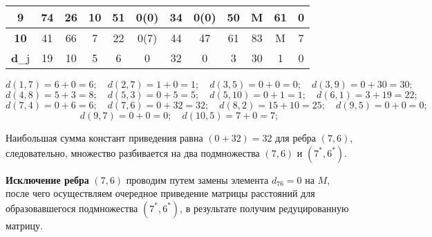 \documentclass[17pt]{extarticle}
\begin{document}
\begin{table}[H]
\begin{tabular}{|c|c|c|c|c|c|c|c|c|c|c|c|}
        \textbf{9}   & 74         & 26         & 10         & 51         & 0(0)       & 34             & 0(0)       & 50         & M          & 61          & 0            \\ \hline
        \textbf{10}  & 41         & 66         & 7          & 22         & 0(7)       & 44             & 47         & 61         & 83         & M           & 7            \\ \hline
        \textbf{d}_j & 19         & 10         & 5          & 6          & 0          & 32             & 0          & 3          & 30         & 1           & 0            \\ \hline
    \end{tabular}
\end{table}

\[ d(1,7) = 6 + 0 = 6; \quad d(2,7) = 1 + 0 = 1; \quad d(3,5) = 0 + 0 = 0; \quad d(3,9) = 0 + 30 = 30; \]
\[ d(4,8) = 5 + 3 = 8; \quad d(5,3) = 0 + 5 = 5; \quad d(5,10) = 0 + 1 = 1; \quad d(6,1) = 3 + 19 = 22; \]
\[ d(7,4) = 0 + 6 = 6; \quad d(7,6) = 0 + 32 = 32; \quad d(8,2) = 15 + 10 = 25; \quad d(9,5) = 0 + 0 = 0; \]
\[ d(9,7) = 0 + 0 = 0; \quad d(10,5) = 7 + 0 = 7; \]

Наибольшая сумма констант приведения равна \( (0 + 32) = 32 \) для ребра \( (7,6) \), следовательно, множество разбивается на два подмножества \( (7,6) \) и \( (7^*,6^*) \).

\textbf{Исключение ребра} \( (7,6) \) проводим путем замены элемента \( d_{76} = 0 \) на \( M \), после чего осуществляем очередное приведение матрицы расстояний для образовавшегося подмножества \( (7^*,6^*) \), в результате получим редуцированную матрицу.
\end{document}
